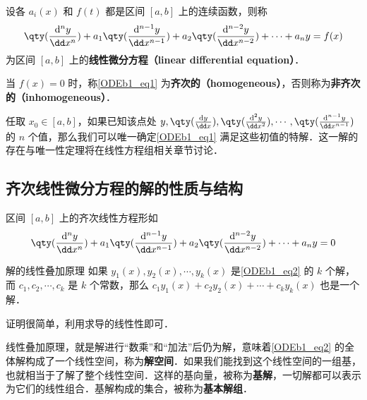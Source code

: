 

\begin{definition}{}
设各 $a_i(x)$ 和 $f(t)$ 都是区间 $[a, b]$ 上的连续函数，则称
\begin{equation}\label{ODEb1_eq1}
\qty(\frac{\mathrm{d}^n y}{\dd x^n})+a_1\qty(\frac{\mathrm{d}^{n-1} y}{\dd x^{n-1}})+a_2\qty(\frac{\mathrm{d}^{n-2} y}{\dd x^{n-2}})+\cdots+a_ny=f(x)
\end{equation}
为区间 $[a, b]$ 上的\textbf{线性微分方程（linear differential equation）}．

当 $f(x)=0$ 时，称\autoref{ODEb1_eq1} 为\textbf{齐次的（homogeneous）}，否则称为\textbf{非齐次的（inhomogeneous）}．
\end{definition}

任取 $x_0\in[a, b]$，如果已知该点处 $y, \qty(\frac{\mathrm{d} y}{\dd x}), \qty(\frac{\mathrm{d}^{2} y}{\dd x^{2}}), \cdots, \qty(\frac{\mathrm{d}^{n-1} y}{\dd x^{n-1}})$ 的 $n$ 个值，那么我们可以唯一确定\autoref{ODEb1_eq1} 满足这些初值的特解．这一解的存在与唯一性定理将在线性方程组相关章节讨论．


\subsection{齐次线性微分方程的解的性质与结构}

区间 $[a, b]$ 上的齐次线性方程形如
\begin{equation}\label{ODEb1_eq2}
\qty(\frac{\mathrm{d}^n y}{\dd x^n})+a_1\qty(\frac{\mathrm{d}^{n-1} y}{\dd x^{n-1}})+a_2\qty(\frac{\mathrm{d}^{n-2} y}{\dd x^{n-2}})+\cdots+a_ny=0
\end{equation}

\begin{theorem}{解的线性叠加原理}
如果 $y_1(x), y_2(x), \cdots, y_k(x)$ 是\autoref{ODEb1_eq2} 的 $k$ 个解，而 $c_1, c_2, \cdots, c_k$ 是 $k$ 个常数，那么 $c_1y_1(x)+c_2y_2(x)+\cdots+c_ky_k(x)$ 也是一个解．
\end{theorem}

证明很简单，利用求导的线性性即可．

线性叠加原理，就是解进行“数乘”和“加法”后仍为解，意味着\autoref{ODEb1_eq2} 的全体解构成了一个线性空间，称为\textbf{解空间}．如果我们能找到这个线性空间的一组基，也就相当于了解了整个线性空间．这样的基向量，被称为\textbf{基解}，一切解都可以表示为它们的线性组合．基解构成的集合，被称为\textbf{基本解组}．

